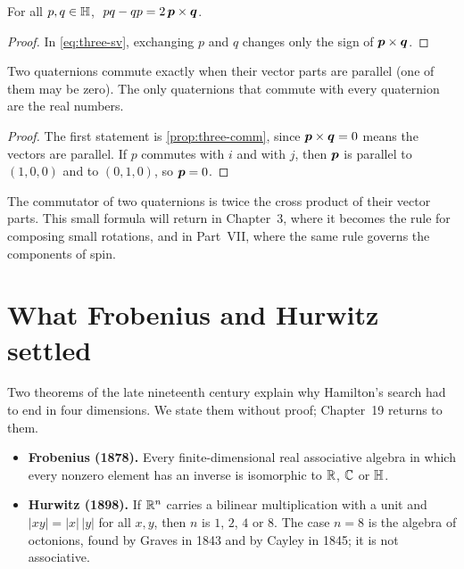 \begin{proposition}\label{prop:three-comm}
For all $p,q\in\mathbb{H}$, $\;pq-qp=2\,\bm{p}\times\bm{q}$.
\end{proposition}

\begin{proof}
In \eqref{eq:three-sv}, exchanging $p$ and $q$ changes only the sign of $\bm{p}\times\bm{q}$.
\end{proof}

\begin{corollary}\label{cor:three-centre}
Two quaternions commute exactly when their vector parts are parallel (one of them may be zero). The only quaternions that commute with every quaternion are the real numbers.
\end{corollary}

\begin{proof}
The first statement is \cref{prop:three-comm}, since $\bm{p}\times\bm{q}=0$ means the vectors are parallel. If $p$ commutes with $i$ and with $j$, then $\bm{p}$ is parallel to $(1,0,0)$ and to $(0,1,0)$, so $\bm{p}=0$.
\end{proof}

The commutator of two quaternions is twice the cross product of their vector parts. This small formula will return in Chapter~3, where it becomes the rule for composing small rotations, and in Part~VII, where the same rule governs the components of spin.

\section{What Frobenius and Hurwitz settled}

Two theorems of the late nineteenth century explain why Hamilton's search had to end in four dimensions. We state them without proof; Chapter~19 returns to them.

\begin{itemize}[itemsep=0.3ex]
\item \textbf{Frobenius (1878).} Every finite-dimensional real associative algebra in which every nonzero element has an inverse is isomorphic to $\mathbb{R}$, $\mathbb{C}$ or $\mathbb{H}$.
\item \textbf{Hurwitz (1898).} If $\mathbb{R}^n$ carries a bilinear multiplication with a unit and $|xy|=|x|\,|y|$ for all $x,y$, then $n$ is $1$, $2$, $4$ or $8$. The case $n=8$ is the algebra of octonions, found by Graves in 1843 and by Cayley in 1845; it is not associative.
\end{itemize}

